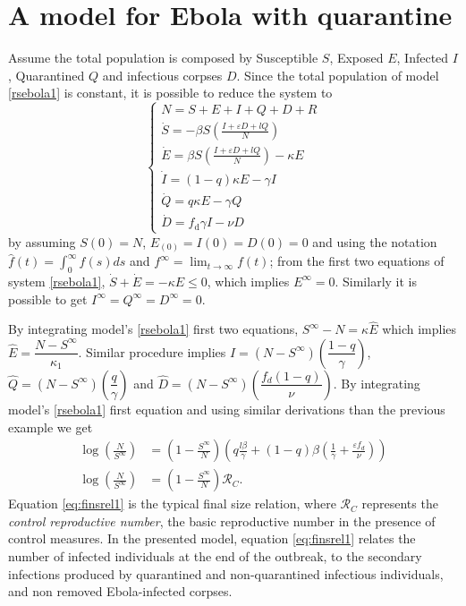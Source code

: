 \documentclass{book}
\begin{document}
\section*{A model for Ebola with quarantine}
Assume the total population is composed by Susceptible $S$, Exposed $E$, Infected $I$, Quarantined $Q$ and infectious corpses $D$.
Since the total population of model \eqref{rsebola1} is constant, it is possible to reduce the system to
\begin{equation} \label{rsebola1}
\left\{\begin{array}{ll}%
N=S+E+I+Q+D+R\\
\dot S = -\beta S  \left( \frac{I + \varepsilon D + l Q}{N}\right)\\
\dot E = \beta S  \left( \frac{I + \varepsilon D + l Q}{N}\right)-\kappa E\\
\dot I= (1-q)\kappa E - \gamma I \\
\dot Q= q \kappa E - \gamma Q\\
\dot D=f_{\text{d}}\gamma I-\nu D
\end{array}\right.
\end{equation}
%
by assuming $S(0)=N$, $E_(0)=I(0)=D(0)=0$ and using the notation $\hat{f}(t)=\int_0^\infty f(s) ds$ and $f^\infty=\lim_{t\rightarrow\infty} f(t)$; from the first two equations of system \eqref{rsebola1}, $\dot{S}+\dot{E}=-\kappa E\leq 0$, which implies $E^\infty=0$. Similarly it is possible to get $I^\infty=Q^\infty=D^\infty=0$.
%

By integrating model's \eqref{rsebola1} first two equations, $S^\infty-N=\kappa \hat{E}$ which implies $\hat{E}=\dfrac{N-S^\infty}{\kappa_1}$. Similar procedure implies $\hat{I}=(N-S^\infty)\left(\dfrac{1-q}{\gamma}\right)$, $\hat{Q}=(N-S^\infty)\left(\dfrac{q}{\gamma}\right)$ and $\hat{D}=(N-S^\infty)\left(\dfrac{f_d(1-q)}{\nu}\right)$.
%
By integrating model's \eqref{rsebola1} first equation and using similar derivations than the previous example we get
\begin{align}
\nonumber \log\left(\frac{N}{S^\infty}\right) &= \left(1-\frac{S^\infty}{N}\right)\left( q\frac{l\beta}{\gamma}+(1-q)\beta\left(\frac{1}{\gamma}+\frac{\varepsilon f_d}{\nu} \right) \right)\\
\log\left(\frac{N}{S^\infty}\right) &= \left(1-\frac{S^\infty}{N}\right) \mathcal{R}_C. \label{eq:finsrel1}
\end{align}
Equation \ref{eq:finsrel1} is the typical final size relation, where $\mathcal{R}_C$ represents the {\it control reproductive number}, the basic reproductive number in the presence of control measures.
%
In the presented model, equation \eqref{eq:finsrel1} relates the number of infected individuals at the end of the outbreak, to the secondary infections produced by quarantined and non-quarantined infectious individuals, and non removed Ebola-infected corpses. 
\end{document}
